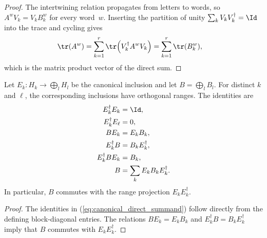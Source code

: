 \begin{proof}
    \leanok
    The intertwining relation propagates from letters to words, so
    $A^wV_k=V_kB_k^w$ for every word~$w$. Inserting the partition of unity
    $\sum_kV_kV_k^\dagger=\Id$ into the trace and cycling gives
    \begin{align}
        \tr(A^w)
         & =\sum_{k=1}^r\tr\!\left(V_k^\dagger A^wV_k\right)
        =\sum_{k=1}^r\tr(B_k^w),
        \notag
    \end{align}
    which is the matrix product vector of the direct sum.
\end{proof}

\begin{lemma}
    \label{lem:matrix_sigma_block_inclusion}
    \leanok
    Let $E_k:H_k\to\bigoplus_lH_l$ be the canonical inclusion and let
    $B=\bigoplus_lB_l$. For distinct $k$ and $\ell$, the corresponding
    inclusions have orthogonal ranges. The identities are
    \begin{align}
        E_k^\dagger E_k
         & =\Id,
        \notag                       \\
        E_k^\dagger E_\ell
         & =0,
        \notag                       \\
        BE_k
         & =E_kB_k,
        \notag                       \\
        E_k^\dagger B
         & =B_kE_k^\dagger,
        \notag                       \\
        E_k^\dagger BE_k
         & =B_k,
        \notag                       \\
        B
         & =\sum_kE_kB_kE_k^\dagger.
        \label{eq:canonical_direct_summand}
    \end{align}
    In particular, $B$ commutes with the range projection
    $E_kE_k^\dagger$.
\end{lemma}

\begin{proof}\leanok
    The identities in (\ref{eq:canonical_direct_summand}) follow directly
    from the defining block-diagonal entries. The relations
    $BE_k=E_kB_k$ and $E_k^\dagger B=B_kE_k^\dagger$ imply that $B$
    commutes with $E_kE_k^\dagger$.
\end{proof}

